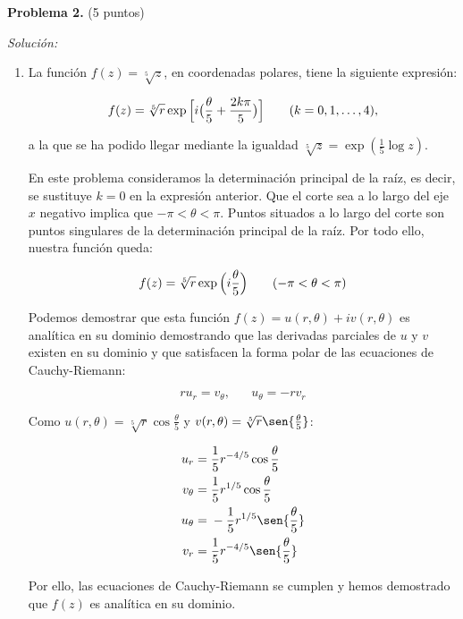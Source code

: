 \textbf{Problema 2.} (5 puntos)

\vspace{20px}
\textit{Solución:}
\\

\begin{enumerate}
[label=\alph*)]
    \item La función $f(z) = \sqrt[5]{z}$, en coordenadas polares, tiene la siguiente expresión:

    \begin{equation*}
        f(z) = \sqrt[5]{r} \exp{\Bigl[i\bigl(\frac{\theta}{5} + \frac{2k\pi}{5}\bigr)\Bigr]} \hspace{20pt} (k = 0,1,\mathellipsis,4),
    \end{equation*}

    a la que se ha podido llegar mediante la igualdad $\sqrt[5]{z} = \exp(\frac{1}{5} \log{z})$.

    En este problema consideramos la determinación principal de la raíz, es decir, se sustituye $k = 0$ en la expresión anterior.
    Que el corte sea a lo largo del eje $x$ negativo implica que $-\pi < \theta < \pi$. Puntos situados a lo largo del corte son
    puntos singulares de la determinación principal de la raíz. Por todo ello, nuestra función queda:

    \begin{equation*}
        f(z) = \sqrt[5]{r} \exp{\Bigl(i\frac{\theta}{5}\Bigl)} \hspace{20pt} (-\pi < \theta < \pi)
    \end{equation*}

    Podemos demostrar que esta función $f(z) = u(r,\theta) + i v(r,\theta)$ es analítica
    en su dominio demostrando que las derivadas parciales de $u$ y $v$ existen en su dominio y que satisfacen la forma polar
    de las ecuaciones de Cauchy-Riemann:

    \begin{equation*}
        r u_r = v_\theta, \hspace{20pt} u_\theta = - r v_r
    \end{equation*}

    Como $u(r,\theta) = \sqrt[5]{r} \cos{\frac{\theta}{5}}$ y $v(r,\theta) = \sqrt[5]{r} \sen{\frac{\theta}{5}}$:

    \begin{align*}
        u_r  = & \;  \frac{1}{5} r^{-4/5} \cos{\frac{\theta}{5}} \\
        v_\theta  = & \;  \frac{1}{5} r^{1/5} \cos{\frac{\theta}{5}} \\
        u_\theta  = & \;  - \frac{1}{5} r^{1/5} \sen{\frac{\theta}{5}} \\
        v_r  = & \;  \frac{1}{5} r^{-4/5} \sen{\frac{\theta}{5}} \\
    \end{align*}

    Por ello, las ecuaciones de Cauchy-Riemann se cumplen y hemos demostrado que $f(z)$ es analítica en su dominio.


\end{enumerate}